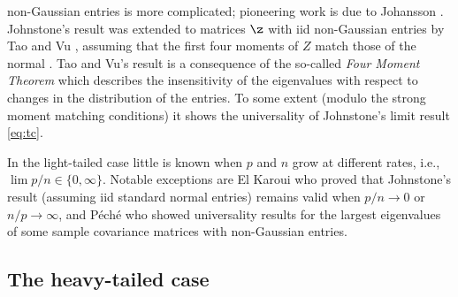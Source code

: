 non-Gaussian entries is more complicated; %
pioneering work is due to Johansson \cite{johansson}. 
Johnstone's result was extended to matrices $\z$ with iid non-Gaussian entries 
by Tao and Vu \cite[Theorem~1.16]{tao09b}, assuming that the first four moments of $Z$ match  those of 
the normal \ds. %
Tao and Vu's result is a consequence of the so-called {\em Four Moment Theorem} 
which describes the insensitivity of the eigenvalues with respect to changes in the distribution of the entries. 
To some extent (modulo the strong moment matching conditions) it shows the universality of Johnstone's limit 
result \eqref{eq:tc}.%
\par
In the light-tailed case little is known when $p$ and $n$ grow at different rates, i.e., $\lim p/n \in\{ 0,\infty\}$. 
Notable exceptions are El Karoui \cite{elkaroui:2003} who proved that Johnstone's result (assuming iid standard normal entries)
remains valid when $p/n\to 0$ or $n/p\to\infty$, and P{\'e}ch{\'e} \cite{peche:2009} who showed universality results for the largest eigenvalues of some sample covariance matrices with non-Gaussian entries.

\subsection{The heavy-tailed case}

